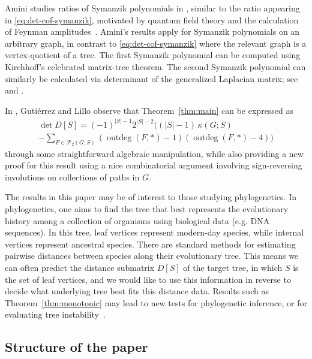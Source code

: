 \documentclass[12pt]{amsart}
\theoremstyle{definition}
\newcommand{\forests}{\mathcal{F}}
\DeclareMathOperator{\outdeg}{outdeg}
\begin{document}
Amini studies ratios of Symanzik polynomials in \cite{amini}, similar to the ratio appearing in \eqref{eq:det-cof-symanzik}, motivated by quantum field theory and the calculation of Feynman amplitudes~\cite{amini-bloch-etal}.
Amini's results apply for Symanzik polynomials on an arbitrary graph, in contrast to \eqref{eq:det-cof-symanzik} where the relevant graph is a vertex-quotient of a tree.
The first Symanzik polynomial can be computed using Kirchhoff's celebrated matrix-tree theorem.
The second Symanzik polynomial can similarly be calculated via determinant of the generalized Laplacian matrix; see 
\cite[Section 1.1]{amini} and \cite[Theorem 7.1]{brown}.


In \cite{gutierrez-lillo}, Guti\'{e}rrez and Lillo observe that Theorem~\ref{thm:main} can be expressed as
\begin{multline}
	\det D[S] = (-1)^{|S| - 1} 2^{|S| - 2} \Big( (|S| - 1)\, \kappa(G;S)  \\
	- \!\!\! \sum_{F \in \forests_2(G;S)} \left(\outdeg(F,*) - 1\right)\left(\outdeg(F,*) - 4\right)  \Big)
\end{multline}
through some straightforward algebraic manipulation,
while also providing a new proof for this result using a nice combinatorial argument involving sign-reversing involutions on collections of paths in $G$.

The results in this paper may be of interest to those studying phylogenetics.
In phylogenetics, one aims to find the tree that best represents the evolutionary history among a collection of organisms using biological data (e.g. DNA sequences).
In this tree, leaf vertices represent modern-day species, while internal vertices represent ancestral species.
There are standard methods for estimating pairwise distances between species along their evolutionary tree. 
This means we can often predict the distance submatrix $D[S]$ of the target tree, in which $S$ is the set of leaf vertices, and we would like to use this information in reverse to decide what underlying tree best fits this distance data.
Results such as Theorem~\ref{thm:monotonic} may lead to new tests for phylogenetic inference, or for evaluating tree instability~\cite{collienne-etal}.



\subsection*{Structure of the paper}
\end{document}
